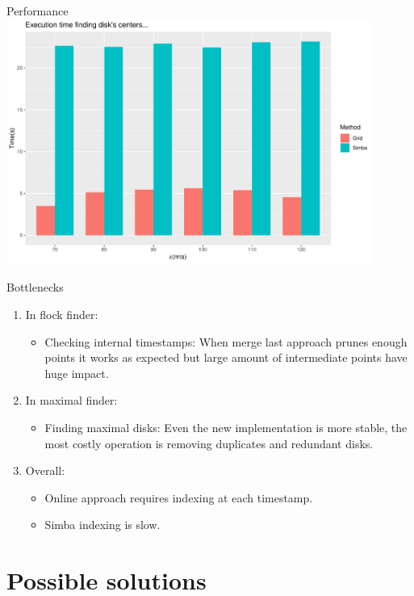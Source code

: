 \documentclass{beamer}
\theoremstyle{definition}
\begin{document}
\begin{frame}{Performance}
    \centering
    \includegraphics[width=0.9\textwidth]{Indexing}
\end{frame}

\begin{frame}{Bottlenecks}
    \begin{enumerate}
        \item In flock finder:
            \begin{itemize}
                \item Checking internal timestamps: When merge last approach prunes enough points it works as expected but large amount of intermediate points have huge impact. 
            \end{itemize}
        \item In maximal finder:
            \begin{itemize}
                \item Finding maximal disks: Even the new implementation is more stable, the most costly operation is removing duplicates and redundant disks.
            \end{itemize}
        \item Overall:
            \begin{itemize}
             \item Online approach requires indexing at each timestamp.
             \item Simba indexing is slow.
            \end{itemize}
    \end{enumerate}
\end{frame}

\section{Possible solutions}
\end{document}
